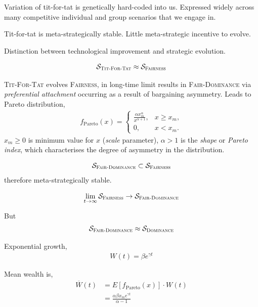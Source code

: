 \documentclass[twocolumn, aps, rmp, amsmath, amssymb, nofootinbib, superscriptaddress, longbibliography, floatfix, table-of-contents, eqsecnum]{revtex4-1}
\begin{document}
Variation of tit-for-tat is genetically hard-coded into us. Expressed widely across many competitive individual and group scenarios that we engage in.

Tit-for-tat is meta-strategically stable. Little meta-strategic incentive to evolve.

Distinction between technological improvement and strategic evolution.

\begin{align}
\mathcal{S}_\textsc{Tit-For-Tat} \approx \mathcal{S}_\textsc{Fairness}	
\end{align}

\textsc{Tit-For-Tat} evolves \textsc{Fairness}, in long-time limit results in \textsc{Fair-Dominance} via \textit{preferential attachment} occurring as a result of bargaining asymmetry. Leads to Pareto distribution,
\begin{align}
f_\text{Pareto}(x) = \left\{\begin{array}{ll}
\frac{\alpha x_m^\alpha}{x^{\alpha+1}}, & x\geq x_m,\\
0, & x<x_m.
\end{array}\right.
\end{align}
$x_m\geq 0$ is minimum value for $x$ (\textit{scale} parameter), $\alpha>1$ is the \textit{shape} or \textit{Pareto index}, which characterises the degree of asymmetry in the distribution.

\begin{align}
	\mathcal{S}_\textsc{Fair-Dominance} \subset \mathcal{S}_\textsc{Fairness}
\end{align}
therefore meta-strategically stable.

\begin{align}
	\lim_{t\to\infty} \mathcal{S}_\textsc{Fairness} \to \mathcal{S}_\textsc{Fair-Dominance}
\end{align}

But
\begin{align}
	\mathcal{S}_\textsc{Fair-Dominance} \approx \mathcal{S}_\textsc{Dominance}
\end{align}

Exponential growth,
\begin{align}
W(t) = \beta e^{\gamma t}	
\end{align}

Mean wealth is,
\begin{align}
	{\overline W}(t) &= E[f_\text{Pareto}(x)] \cdot W(t) \nonumber\\
	&= \frac{\alpha \beta x_m e^{\gamma t}}{\alpha - 1}
\end{align}
\end{document}
